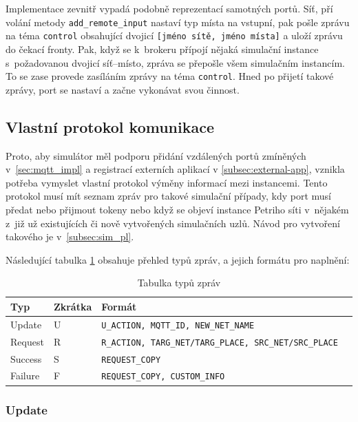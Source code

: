Implementace zevnitř vypadá podobně reprezentací samotných portů. Síť, pří volání metody \texttt{add\_remote\_input} nastaví typ místa na vstupní, pak pošle zprávu na téma \texttt{control} obsahující dvojicí \texttt{[jméno sítě, jméno místa]} a uloží zprávu do čekací fronty. Pak, když se k~brokeru přípojí nějaká simulační instance s~požadovanou dvojicí síť--místo, zpráva se přepošle všem simulačním instancím. To se zase provede zasíláním zprávy na téma \texttt{control}. Hned po přijetí takové zprávy, port se nastaví a začne vykonávat svou činnost.

\subsection{Vlastní protokol komunikace}
\label{subsec:comm-proto}

Proto, aby simulátor měl podporu přidání vzdálených portů zmíněných v~\ref{sec:mqtt_impl} a registrací externích aplikací v \ref{subsec:external-app}, vznikla potřeba vymyslet vlastní protokol výměny informací mezi instancemi. Tento protokol musí mít seznam zpráv pro takové simulační případy, kdy port musí předat nebo přijmout tokeny nebo když se objeví instance Petriho síti v~nějakém z~již už existujících či nově vytvořených simulačních uzlů. Návod pro vytvoření takového je v~\ref{subsec:sim_pl}.

Následující tabulka \ref{tab:mqtt-msg-types} obsahuje přehled typů zpráv, a jejich formátu pro naplnění:

\begin{table}[H]
  \vskip6pt
  \caption{Tabulka typů zpráv}
  \vskip6pt
  \centering
  \begin{tabular}{lllr}
    \toprule
    Typ & Zkrátka & Formát \\
    \midrule
    Update & U~& \texttt{U\_ACTION, MQTT\_ID, NEW\_NET\_NAME} \\
    Request & R & \texttt{R\_ACTION, TARG\_NET/TARG\_PLACE, SRC\_NET/SRC\_PLACE} \\
    Success & S~& \texttt{REQUEST\_COPY} \\
    Failure & F & \texttt{REQUEST\_COPY, CUSTOM\_INFO} \\
    \bottomrule
  \end{tabular}
  \label{tab:mqtt-msg-types}
\end{table}

\subsubsection{Update}

